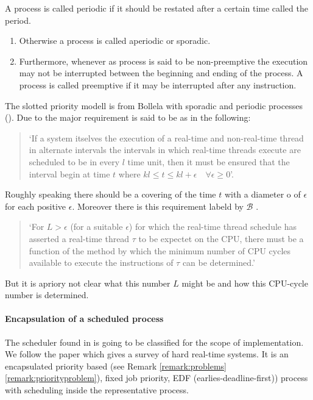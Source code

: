 \begin{definition}
	 A process is called periodic if it should be restated after a certain time called the period.
	 \begin{enumerate}[label=(\roman*)] 
	\item Otherwise a process is called aperiodic or sporadic.
	\item Furthermore, whenever as process is said to be non-preemptive the execution may not be interrupted between the beginning and ending of the process. 
		A process is called preemptive if it may be interrupted after any instruction.
	\end{enumerate}
	\end{definition}  
 
The slotted priority modell is from Bollela \cite{B97} with  sporadic and periodic processes (\cite{K}).
Due to \cite{B97} the major requirement is said to be as in the following:

\begin{quote}
	`If a system itselves the execution of a real-time and non-real-time thread in alternate intervals the intervals in which real-time threads execute are scheduled to be in every $l$ time unit, then it must be ensured that the interval begin at time $t$ where $kl \leq t \leq kl+\epsilon \quad \forall
 \epsilon \geq 0$'.
\end{quote}

Roughly speaking there should be a covering of the time $t$ with a diameter o
of $\epsilon$ for each positive $\epsilon$.
Moreover there is this requirement labeld by  $\mathcal{B}$ \cite{B97}.
\begin{quote}
`For $L>\epsilon$ (for a suitable $\epsilon$) for which the real-time thread schedule has asserted a real-time thread $\tau$ to be expectet on the CPU, there must be a function of the method by which the minimum number of CPU cycles available to execute the instructions of $\tau$ can be determined.'
\end{quote}
But it is apriory not clear what this number $L$ might be and how this CPU-cycle number is determined.


\paragraph*{Encapsulation of a scheduled process}
 
The scheduler found in \cite{K} is going to be classified for the scope of implementation. 
We follow the paper \cite{DB2011} which gives a survey of hard real-time systems.
It is an encapsulated priority based (see Remark \ref{remark:problems} \ref{remark:priorityproblem}), fixed job priority,   EDF (earlies-deadline-first)) process with scheduling inside the representative process.

